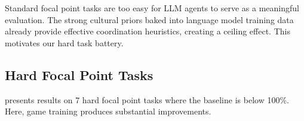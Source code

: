 Standard focal point tasks are too easy for LLM agents to serve as a meaningful evaluation.
The strong cultural priors baked into language model training data already provide effective coordination heuristics, creating a ceiling effect.
This motivates our hard task battery.

\subsection{Hard Focal Point Tasks}
\label{sec:hard_focal}

 presents results on 7 hard focal point tasks where the baseline is below 100\%.
Here, game training produces substantial improvements.

\begin{table}[t]
\centering
\caption{Match rates (\%) on hard focal point tasks where the baseline is below 100\% ($N{=}50$ pairs). Improvement ratios over the \nogame baseline are shown in parentheses. Best result per task in \textbf{bold}. Tasks achieving ${\geq}2\times$ improvement are marked with $\star$.}
\label{tab:hard_focal}
\small
{}
\end{table}

